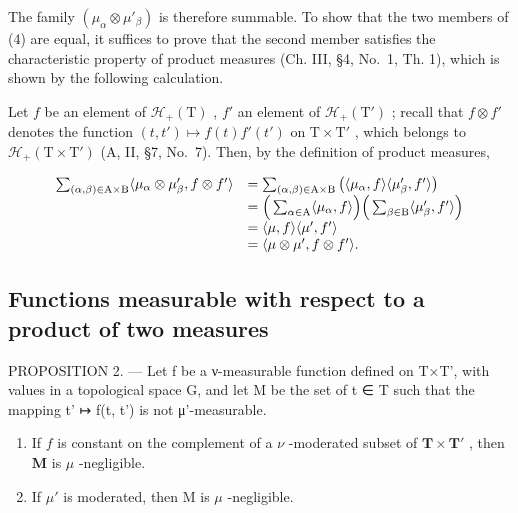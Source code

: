 The family \((\mu_{\alpha} \otimes \mu'_{\beta})\) is therefore summable. To show that the two members of (4) are equal, it suffices to prove that the second member satisfies the characteristic property of product measures (Ch. III, §4, No.~1, Th. 1), which is shown by the following calculation.

Let \(f\) be an element of \(\mathcal{H}_{+}(\mathrm{T})\) , \(f'\) an element of \(\mathcal{H}_{+}(\mathrm{T}')\) ; recall that \(f \otimes f'\) denotes the function \((t, t') \mapsto f(t)f'(t')\) on \(\mathrm{T} \times \mathrm{T}'\) , which belongs to \(\mathcal{H}_{+}(\mathrm{T} \times \mathrm{T}')\) (A, II, §7, No.~7). Then, by the definition of product measures,

\[
\begin{array}{r l} \sum_ {(\alpha , \beta) \in \mathrm{A} \times \mathrm{B}} \langle \mu_ {\alpha} \otimes \mu_ {\beta} ^ {\prime}, f \otimes f ^ {\prime} \rangle & = \sum_ {(\alpha , \beta) \in \mathrm{A} \times \mathrm{B}} \big (\langle \mu_ {\alpha}, f \rangle \langle \mu_ {\beta} ^ {\prime}, f ^ {\prime} \rangle \big) \\ & = \Big (\sum_ {\alpha \in \mathrm{A}} \langle \mu_ {\alpha}, f \rangle \Big) \Big (\sum_ {\beta \in \mathrm{B}} \langle \mu_ {\beta} ^ {\prime}, f ^ {\prime} \rangle \Big) \\ & = \langle \mu , f \rangle \langle \mu^ {\prime}, f ^ {\prime} \rangle \\ & = \langle \mu \otimes \mu^ {\prime}, f \otimes f ^ {\prime} \rangle . \end{array}
\]

\subsection{Functions measurable with respect to a product of two measures}

PROPOSITION 2. --- Let f be a ν-measurable function defined on T×T', with values in a topological space G, and let M be the set of t ∈ T such that the mapping t' ↦ f(t, t') is not μ'-measurable.

\begin{enumerate}
\def\labelenumi{\alph{enumi})}
\item
  If \(f\) is constant on the complement of a \(\nu\) -moderated subset of \(\mathbf{T} \times \mathbf{T}'\) , then \(\mathbf{M}\) is \(\mu\) -negligible.
\item
  If \(\mu'\) is moderated, then M is \(\mu\) -negligible.
\end{enumerate}

